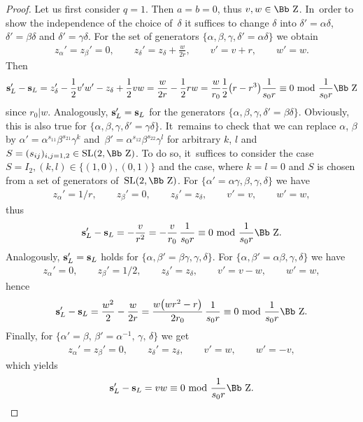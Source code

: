 \documentclass[pdftex]{sigma}
\newcommand\ZZ{{\mbox{\Bb Z}}}
\newcommand\bs{\textbf{{\rm \textbf{s}}}}
\newcommand{\SL}{\mathop{{\rm SL}}}
\numberwithin{equation}{section}
\begin{document}
\begin{proof}
Let us first consider $q=1$. Then $a=b=0$, thus $v,w\in\ZZ$. In~order to show the independence of the choice of~$\delta$ it suffices to change $\delta$ into $\delta'=\alpha\delta$, $\delta'=\beta\delta$ and $\delta'=\gamma\delta$. For the set of generators $\{\alpha,\beta,\gamma,\delta'=\alpha\delta\}$ we obtain
\begin{gather}\label{ad}
 z_\alpha'= z_\beta'=0,\qquad z_\delta'= z_\delta+\frac w{2r},\qquad v'=v+r,\qquad w'=w.
\end{gather}
Then
\begin{gather*}
\bs_L'-\bs_L =z_\delta'-\frac{1}{2}v'w'-z_\delta+\frac{1}{2}vw=\frac w{2r}-\frac12 rw=\frac w{r_0} \frac12 \big(r-r^3\big) \frac1{s_0r}\equiv 0\ {\rm mod}\ \frac{1}{s_0r}\ZZ
\end{gather*}
since $r_0|w$. Analogously, $\bs_L'=\bs_L$ for the generators $\{\alpha,\beta,\gamma,\delta'=\beta\delta\}$. Obviously, this is also true for $\{\alpha,\beta,\gamma,\delta'=\gamma\delta\}$. It~remains to check that we can replace $\alpha$, $\beta$ by $\alpha'=\alpha^{s_{11}}\beta^{s_{21}}\gamma^k$ and~$\beta'=\alpha^{s_{12}}\beta^{s_{22}}\gamma^l$ for arbitrary $k$, $l$ and $S=(s_{ij})_{i,j=1,2}\in\SL(2,\ZZ)$. To do so, it~suffices to consider the case $S=I_2, (k,l)\in\{(1,0),(0,1)\}$ and the case, where $k=l=0$ and $S$ is chosen from a set of generators of~$\SL(2,\ZZ)$. For $\{\alpha'=\alpha\gamma,\beta,\gamma,\delta\}$ we have
\begin{gather*}
z_\alpha'= 1/r,\qquad z_\beta'=0,\qquad z_\delta'= z_\delta,\qquad v'=v,\qquad w'=w,
\end{gather*}
thus
\begin{gather*}
\bs_L'-\bs_L = -\frac v{r^2}=-\frac v{r_0}\, \frac 1{s_0r} \equiv 0\ {\rm mod}\ \frac{1}{s_0r}\ZZ.
\end{gather*}
Analogously, $\bs_L'=\bs_L$ holds for $\{\alpha,\beta'=\beta\gamma,\gamma,\delta\}$. For $\{\alpha,\beta'=\alpha\beta,\gamma,\delta\}$
we have
\begin{gather*}
z_\alpha'= 0,\qquad z_\beta'=1/2,\qquad z_\delta'= z_\delta,\qquad v'=v-w,\qquad w'=w,
\end{gather*}
hence
\begin{gather*}
\bs_L'-\bs_L = \frac {w^2}{2}-\frac w{2r}= \frac{w\big(wr^2-r\big)}{2r_0}\,\frac 1{s_0r} \equiv 0\ {\rm mod}\ \frac{1}{s_0r}\ZZ.
\end{gather*}
Finally, for $\big\{\alpha'=\beta,\,\beta'=\alpha^{-1},\,\gamma,\,\delta\big\}$ we get
\begin{gather*}
 z_\alpha'= z_\beta'=0,\qquad z_\delta'= z_\delta,\qquad v'=w,\qquad w'=-v,
 \end{gather*}
which yields
\begin{gather*}
 \bs_L'-\bs_L = vw \equiv 0\ {\rm mod}\ \frac{1}{s_0r}\ZZ.
 \end{gather*}



\end{proof}
\end{document}
